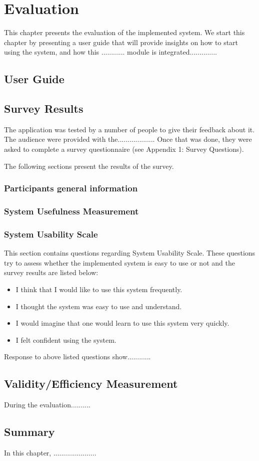 \chapter{Evaluation}
\label{cha:evaluation}

This chapter presents the evaluation of the implemented system. We start this chapter by presenting a user guide that will provide insights on how to start using the system, and how this ............ module is integrated..............

\section{User Guide}

 
\section{Survey Results}
The application was tested by a number of people to give their feedback about it. The audience were provided with the................... Once that was done, they were asked to complete a survey questionnaire (see Appendix 1: Survey Questions). 

The following sections present the results of the survey.


\subsection{Participants general information}

\subsection{System Usefulness Measurement}


\subsection{System Usability Scale}
This section contains questions regarding System Usability Scale. These questions try to assess whether the implemented system is easy to use or not and the survey results are listed below:

\begin{itemize}
\item I think that I would like to use this system frequently.
\item I thought the system was easy to use and understand.
\item I would imagine that one would learn to use this system very quickly.
\item I felt confident using the system.
\end{itemize}

Response to above listed questions show............


\section{Validity/Efficiency Measurement}

During the evaluation..........


\section{Summary}
In this chapter, ......................